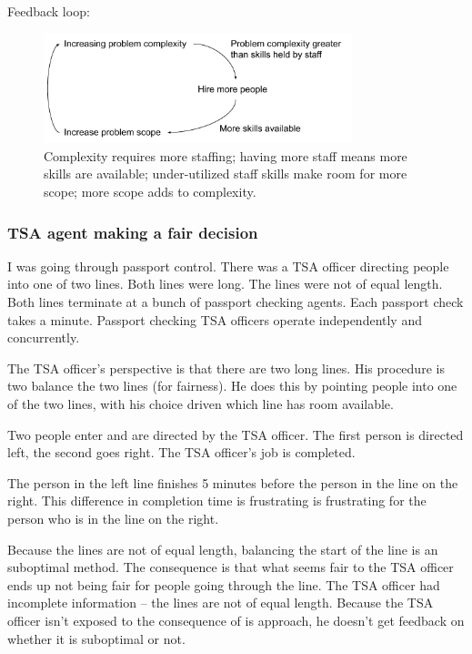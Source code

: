Feedback loop:
\begin{center}
\begin{figure}[ht]
    \centering
    \includegraphics[width=0.8\textwidth]{images/feedback_loop_complexity_and_staffing}
    \caption{Complexity requires more staffing; having more staff means more skills are available; under-utilized staff skills make room for more scope; more scope adds to complexity.}
    \label{fig:complexity_and_staff_growth}
\end{figure}
\end{center}

\subsubsection{TSA agent making a fair decision}
I was going through passport control. There was a TSA officer directing people into one of two lines. Both lines were long. The lines were not of equal length. Both lines terminate at a bunch of passport checking agents. Each passport check takes a minute. Passport checking TSA officers operate independently and concurrently.


The TSA officer's perspective is that there are two long lines. His procedure is two balance the two lines (for fairness). He does this by pointing people into one of the two lines, with his choice driven which line has room available.

Two people enter and are directed by the TSA officer. The first person is directed left, the second goes right. The TSA officer's job is completed.

The person in the left line finishes 5 minutes before the person in the line on the right. This difference in completion time is frustrating is frustrating for the person who is in the line on the right.

Because the lines are not of equal length, balancing the start of the line is an suboptimal method. The consequence is that what seems fair to the TSA officer ends up not being fair for people going through the line. The TSA officer had incomplete information -- the lines are not of equal length. Because the TSA officer isn't exposed to the consequence of is approach, he doesn't get feedback on whether it is suboptimal or not.

